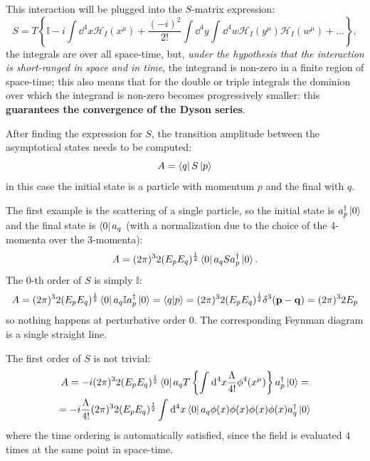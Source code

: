 
This interaction will be plugged into the $S$-matrix expression:
$$S = T\left\{\mathbb{I} -i\int \dd^4x \mathcal{H}_I(x^\mu) + \frac{(-i)^2}
{2!}\int\dd^4y\int_{}^{} \dd^4w \mathcal{H}_I(y^\mu)\mathcal{H}_I(w^\mu) 
+...\right\},$$
the integrals are over all space-time, but, \textit{under the hypothesis that
the interaction is short-ranged in space and in time}, the integrand is
non-zero in a finite region of space-time; this also means that for the
double or triple integrals the dominion over which the integrand is non-zero
becomes progressively smaller: this \textbf{guarantees the convergence of the
Dyson series}.

After finding the expression for $S$, the transition amplitude between the
asymptotical states needs to be computed:
$$A=\bra{q}S\ket{p}$$
in this case the initial state is a particle with momentum $p$ and the final
with $q$.

The first example is the scattering of a single particle, so the initial state
is $a_p^\dagger\ket{0}$ and the final state is $\bra{0}a_q$ (with a normalization
due to the choice of the 4-momenta over the 3-momenta):
$$A = (2\pi)^32(E_pE_q)^{\frac{1}{2}}\bra{0}a_q S a_p^\dagger\ket{0}.$$
The $0$-th order of $S$ is simply $\mathbb{I}$:
$$A = (2\pi)^32(E_pE_q)^{\frac{1}{2}}\bra{0}a_q\mathbb{I}a_p^\dagger\ket{0} =
\bra{q}\ket{p} = (2\pi)^32(E_pE_q)^{\frac{1}{2}}\delta^3(\mathbf{p-q}) =
(2\pi)^3 2E_p$$
so nothing happens at perturbative order $0$. The corresponding Feynman diagram
is a single straight line.

The first order of $S$ is not trivial:
\begin{gather*}
A = -i(2\pi)^32(E_pE_q)^{\frac{1}{2}}\bra{0}a_q T\left\{\int_{}^{}\dd^4x
\frac{\Lambda}{4!}\phi^4(x^\mu)\right\}a_p^\dagger\ket{0}=\\=
-i\frac{\Lambda}{4!}(2\pi)^32(E_pE_q)^{\frac{1}{2}}\int_{}^{} \dd^4x
\bra{0}a_q\phi(x)\phi(x)\phi(x)\phi(x)a^\dagger_q\ket{0}
\end{gather*}
where the time ordering is automatically satisfied, since the field is
evaluated $4$ times at the same point in space-time.

